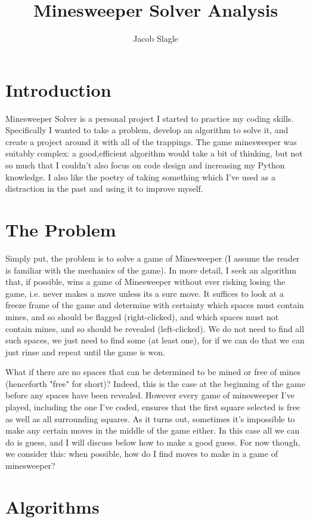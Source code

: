 \documentclass{article}
\title{Minesweeper Solver Analysis}
\author{Jacob Slagle}
\begin{document}
	\maketitle
	
	\section*{Introduction}
	Minesweeper Solver is a personal project I started to practice my coding skills. Specifically I wanted to take a problem, develop an algorithm to solve it, and create a project around it with all of the trappings. The game minesweeper was suitably complex: a good,efficient algorithm would take a bit of thinking, but not so much that I couldn't also focus on code design and increasing my Python knowledge. I also like the poetry of taking something which I've used as a distraction in the past and using it to improve myself.
	
	\section*{The Problem}
	Simply put, the problem is to solve a game of Minesweeper (I assume the reader is familiar with the mechanics of the game). In more detail, I seek an algorithm that, if possible, wins a game of Minesweeper without ever risking losing the game, i.e. never makes a move unless its a sure move. It suffices to look at a freeze frame of the game and determine with certainty which spaces must contain mines, and so should be flagged (right-clicked), and which spaces must not contain mines, and so should be revealed (left-clicked). We do not need to find all such spaces, we just need to find some (at least one), for if we can do that we can just rinse and repeat until the game is won.
	
	What if there are no spaces that can be determined to be mined or free of mines (henceforth "free" for short)? Indeed, this is the case at the beginning of the game before any spaces have been revealed. However every game of minesweeper I've played, including the one I've coded, ensures that the first square selected is free as well as all surrounding squares. As it turns out, sometimes it's impossible to make any certain moves in the middle of the game either. In this case all we can do is guess, and I will discuss below how to make a good guess. For now though, we consider this: when possible, how do I find moves to make in a game of minesweeper?
	
	\section*{Algorithms}
	
	
	
	
\end{document}
